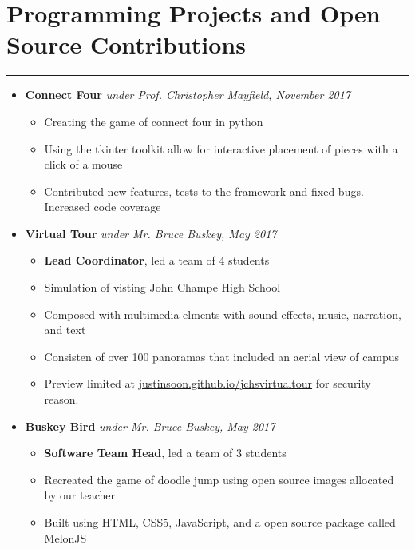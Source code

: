 \documentclass[a4paper]{article}
\begin{document}
\section*{Programming Projects and Open Source Contributions}
\hrule
\vspace{3mm}
\begin{itemize}
	\item
	      \textbf{Connect Four}
	      \hfill \textit{under Prof. Christopher Mayfield, November 2017}
	      \begin{itemize}
	      	\vspace{-2mm} \setlength\itemsep{-0.7mm}
		\item Creating the game of connect four in python
		\item Using the tkinter toolkit allow for interactive placement of pieces with a click of a mouse
		\item Contributed new features, tests to the framework and fixed bugs. Increased code coverage
	      \end{itemize}
	\item
	      \textbf{Virtual Tour}
	      \hfill \textit{under Mr. Bruce Buskey, May 2017}
	      \begin{itemize}
	      	\vspace{-2mm} \setlength\itemsep{-0.7mm}
		\item \textbf{Lead Coordinator}, led a team of 4 students
		\item Simulation of visting John Champe High School
		\item Composed with multimedia elments with sound effects, music, narration, and text
		\item Consisten of over 100 panoramas that included an aerial view of campus
		\item Preview limited at \href{https://justinsoon.github.io/jchsvirtualtour/}{justinsoon.github.io/jchsvirtualtour} for security reason. 
	      \end{itemize}
	\item
	      \textbf{Buskey Bird}
	      \hfill \textit{under Mr. Bruce Buskey, May 2017}
	      \begin{itemize}
	      	\vspace{-2mm} \setlength\itemsep{-0.7mm}
		\item \textbf{Software Team Head}, led a team of 3 students
		\item Recreated the game of doodle jump using open source images allocated by our teacher
		\item Built using HTML, CSS5, JavaScript, and a open source package called MelonJS

\end{itemize}
\end{itemize}
\end{document}
